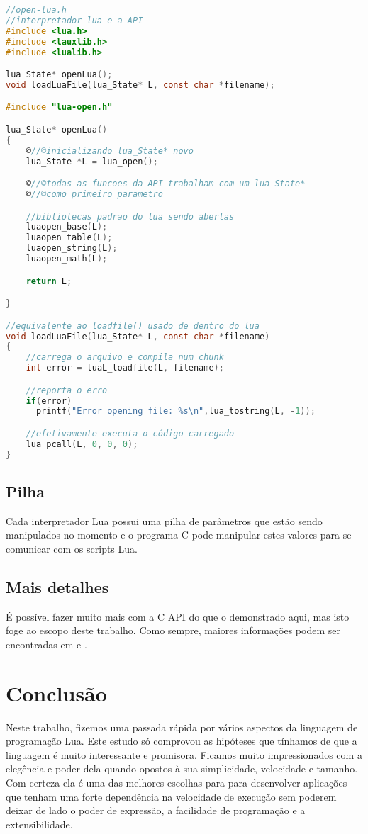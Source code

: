 \documentclass[a4paper,12pt]{abnt}
\begin{document}
\begin{lstlisting}[language=C]
//open-lua.h
//interpretador lua e a API
#include <lua.h>
#include <lauxlib.h>
#include <lualib.h>

lua_State* openLua();
void loadLuaFile(lua_State* L, const char *filename);

#include "lua-open.h"

lua_State* openLua()
{
    ©//©inicializando lua_State* novo
    lua_State *L = lua_open();

    ©//©todas as funcoes da API trabalham com um lua_State*
    ©//©como primeiro parametro

    //bibliotecas padrao do lua sendo abertas
    luaopen_base(L);
    luaopen_table(L);
    luaopen_string(L);
    luaopen_math(L);

    return L;

}

//equivalente ao loadfile() usado de dentro do lua
void loadLuaFile(lua_State* L, const char *filename)
{
    //carrega o arquivo e compila num chunk
    int error = luaL_loadfile(L, filename);

    //reporta o erro
    if(error)
      printf("Error opening file: %s\n",lua_tostring(L, -1));

    //efetivamente executa o código carregado
    lua_pcall(L, 0, 0, 0);
}
\end{lstlisting}

\section{Pilha}

Cada interpretador Lua possui uma
pilha de parâmetros que estão sendo manipulados no momento e o
programa C pode manipular estes valores para se comunicar com os scripts
Lua.

\section{Mais detalhes}

É possível fazer muito mais com a C API do que o
demonstrado aqui, mas isto foge ao escopo deste trabalho.
Como sempre, maiores informações podem ser encontradas em \cite{luamanual} e
\cite{pil}.

\chapter{Conclusão}

Neste trabalho, fizemos uma passada rápida por vários aspectos da linguagem de
programação Lua. Este estudo só comprovou as hipóteses que tínhamos de que
a linguagem é muito interessante e promisora. Ficamos muito impressionados
com a elegência e poder dela quando opostos à sua simplicidade, velocidade e
tamanho. Com certeza ela é uma das melhores escolhas para para desenvolver
aplicações que tenham uma forte dependência na velocidade de execução sem
poderem deixar de lado o poder de expressão, a facilidade de programação e
a extensibilidade.



\end{document}
